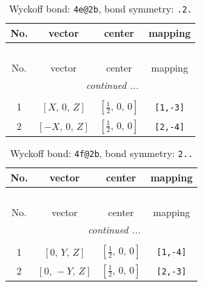 \documentclass[fleqn,8pt]{jsarticle}
\begin{document}
\renewcommand{\arraystretch}{1.2}
\begin{longtable}{cccc}
\caption{Wyckoff bond: {\tt 4e@2b}, bond symmetry: {\tt .2.}}
 \\
 \hline \hline
No. & vector & center & mapping \\ \hline \endfirsthead

\multicolumn{3}{l}{\tablename\ \thetable{}} \\
 \hline \hline
No. & vector & center & mapping \\ \hline \endhead

 \hline \hline
\multicolumn{3}{r}{\footnotesize\it continued ...} \\ \endfoot

 \hline \hline
\multicolumn{3}{r}{} \\ \endlastfoot

1 & $\left[ X,\, 0,\, Z \right]$ & $\left[ \frac{1}{2},\, 0,\, 0 \right]$ & {\tt [1,-3]} \\ \hline
2 & $\left[ - X,\, 0,\, Z \right]$ & $\left[ \frac{1}{2},\, 0,\, 0 \right]$ & {\tt [2,-4]} \\
\end{longtable}
\renewcommand{\arraystretch}{1.2}
\begin{longtable}{cccc}
\caption{Wyckoff bond: {\tt 4f@2b}, bond symmetry: {\tt 2..}}
 \\
 \hline \hline
No. & vector & center & mapping \\ \hline \endfirsthead

\multicolumn{3}{l}{\tablename\ \thetable{}} \\
 \hline \hline
No. & vector & center & mapping \\ \hline \endhead

 \hline \hline
\multicolumn{3}{r}{\footnotesize\it continued ...} \\ \endfoot

 \hline \hline
\multicolumn{3}{r}{} \\ \endlastfoot

1 & $\left[ 0,\, Y,\, Z \right]$ & $\left[ \frac{1}{2},\, 0,\, 0 \right]$ & {\tt [1,-4]} \\ \hline
2 & $\left[ 0,\, - Y,\, Z \right]$ & $\left[ \frac{1}{2},\, 0,\, 0 \right]$ & {\tt [2,-3]} \\
\end{longtable}
\renewcommand{\arraystretch}{1.2}
\end{document}
